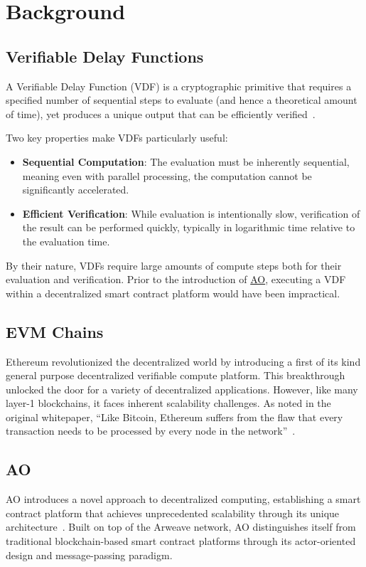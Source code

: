 \section{Background}\label{sec:background}

\subsection{Verifiable Delay Functions}\label{sec:vdf}
A Verifiable Delay Function (VDF) is a cryptographic primitive that requires a specified number of sequential steps to evaluate (and hence a theoretical amount of time), yet produces a unique output that can be efficiently verified~\cite{boneh2018verifiable}.

Two key properties make VDFs particularly useful:
\begin{itemize}
    \item \textbf{Sequential Computation}: The evaluation must be inherently sequential, meaning even with parallel processing, the computation cannot be significantly accelerated.
    \item \textbf{Efficient Verification}: While evaluation is intentionally slow, verification of the result can be performed quickly, typically in logarithmic time relative to the evaluation time.
\end{itemize}

By their nature, VDFs require large amounts of compute steps both for their evaluation and verification. Prior to the introduction of \hyperref[sec:ao]{AO}, executing a VDF within a decentralized smart contract platform would have been impractical.

\subsection{EVM Chains}\label{sec:evm}
Ethereum revolutionized the decentralized world by introducing a first of its kind general purpose decentralized verifiable compute platform. This breakthrough unlocked the door for a variety of decentralized applications. However, like many layer-1 blockchains, it faces inherent scalability challenges. As noted in the original whitepaper, ``Like Bitcoin, Ethereum suffers from the flaw that every transaction needs to be processed by every node in the network''~\cite{buterin2014ethereum}.

\subsection{AO}\label{sec:ao}
AO introduces a novel approach to decentralized computing, establishing a smart contract platform that achieves unprecedented scalability through its unique architecture~\cite{williams2024ao}. Built on top of the Arweave network, AO distinguishes itself from traditional blockchain-based smart contract platforms through its actor-oriented design and message-passing paradigm.

